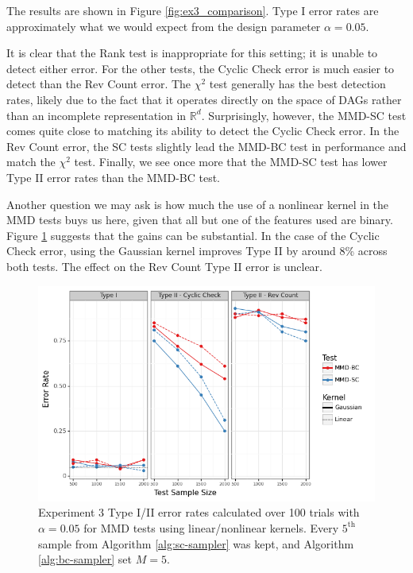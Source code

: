 \documentclass[a4paper,11pt]{article}
\begin{document}
The results are shown in Figure \ref{fig:ex3_comparison}. Type I error rates are approximately what we would expect from the design parameter $\alpha=0.05$.

It is clear that the Rank test is inappropriate for this setting; it is unable to detect either error. For the other tests, the Cyclic Check error is much easier to detect than the Rev Count error. The $\chi^{2}$ test generally has the best detection rates, likely due to the fact that it operates directly on the space of DAGs rather than an incomplete representation in $\mathbb{R}^{d}$. Surprisingly, however, the MMD-SC test comes quite close to matching its ability to detect the Cyclic Check error. In the Rev Count error, the SC tests slightly lead the MMD-BC test in performance and match the $\chi^{2}$ test. Finally, we see once more that the MMD-SC test has lower Type II error rates than the MMD-BC test.

Another question we may ask is how much the use of a nonlinear kernel in the MMD tests buys us here, given that all but one of the features used are binary. Figure \ref{fig:ex3_kernel} suggests that the gains can be substantial. In the case of the Cyclic Check error, using the Gaussian kernel improves Type II by around 8\% across both tests. The effect on the Rev Count Type II error is unclear.

\begin{figure}
    \centering
    \includegraphics[width=\textwidth]{figures/graph_kernel.png}
    \caption{Experiment 3 Type I/II error rates calculated over 100 trials with $\alpha=0.05$ for MMD tests using linear/nonlinear kernels. Every $5^{\text{th}}$ sample from Algorithm \ref{alg:sc-sampler} was kept, and Algorithm \ref{alg:bc-sampler} set $M=5$.}
    \label{fig:ex3_kernel}
\end{figure}
\end{document}
